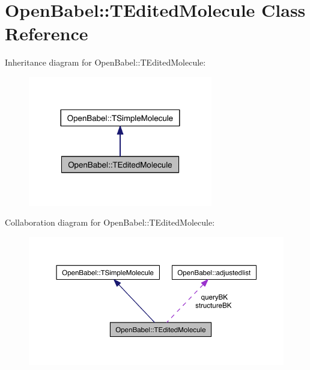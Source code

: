 \hypertarget{class_open_babel_1_1_t_edited_molecule}{\section{Open\-Babel\-:\-:T\-Edited\-Molecule Class Reference}
\label{class_open_babel_1_1_t_edited_molecule}
}


Inheritance diagram for Open\-Babel\-:\-:T\-Edited\-Molecule\-:
\nopagebreak
\begin{figure}[H]
\begin{center}
\leavevmode
\includegraphics[width=228pt]{class_open_babel_1_1_t_edited_molecule__inherit__graph}
\end{center}
\end{figure}


Collaboration diagram for Open\-Babel\-:\-:T\-Edited\-Molecule\-:
\nopagebreak
\begin{figure}[H]
\begin{center}
\leavevmode
\includegraphics[width=350pt]{class_open_babel_1_1_t_edited_molecule__coll__graph}
\end{center}
\end{figure}

